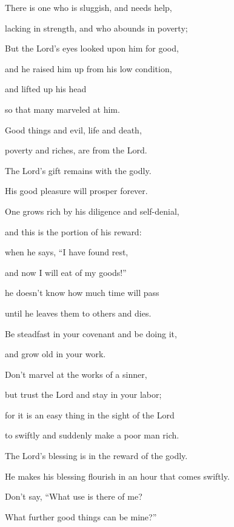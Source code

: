 {\par }{\Q {}There is one who is sluggish, and needs help,
\par }{\QB lacking in strength, and who abounds in poverty;
\par }{\Q But the Lord’s eyes looked upon him for good,
\par }{\QB and he raised him up from his low condition,
\par }{\Q {}and lifted up his head
\par }{\QB so that many marveled at him.
\par }{\BB \par }{\Q {}Good things and evil, life and death,
\par }{\QB poverty and riches, are from the Lord.
\par }{\Q {}The Lord’s gift remains with the godly.
\par }{\QB His good pleasure will prosper forever.
\par }{\Q {}One grows rich by his diligence and self-denial,
\par }{\QB and this is the portion of his reward:
\par }{\Q {}when he says, “I have found rest,
\par }{\QB and now I will eat of my goods!”
\par }{\Q he doesn’t know how much time will pass
\par }{\QB until he leaves them to others and dies.
\par }{\Q {}Be steadfast in your covenant and be doing it,
\par }{\QB and grow old in your work.
\par }{\BB \par }{\Q {}Don’t marvel at the works of a sinner,
\par }{\QB but trust the Lord and stay in your labor;
\par }{\Q for it is an easy thing in the sight of the Lord
\par }{\QB to swiftly and suddenly make a poor man rich.
\par }{\Q {}The Lord’s blessing is in the reward of the godly.
\par }{\QB He makes his blessing flourish in an hour that comes swiftly.
\par }{\Q {}Don’t say, “What use is there of me?
\par }{\QB What further good things can be mine?”
}
